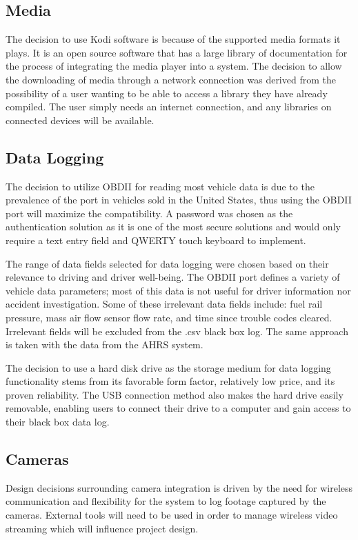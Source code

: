 \documentclass[onecolumn, draftclsnofoot,10pt, compsoc]{IEEEtran}
\begin{document}
\subsection{Media}
The decision to use Kodi software is because of the supported media formats it plays. It is an open source software that has a large library of documentation for the process of integrating the media player into a system. 
The decision to allow the downloading of media through a network connection was derived from the possibility of a user wanting to be able to access a library they have already compiled. The user simply needs an internet connection, and any libraries on connected devices will be available.

\subsection{Data Logging}
The decision to utilize OBDII for reading most vehicle data is due to the prevalence of the port in vehicles sold in the United States, thus using the OBDII port will maximize the compatibility. A password was chosen as the authentication solution as it is one of the most secure solutions and would only require a text entry field and QWERTY touch keyboard to implement.\par
The range of data fields selected for data logging were chosen based on their relevance to driving and driver well-being. The OBDII port defines a variety of vehicle data parameters; most of this data is not useful for driver information nor accident investigation. Some of these irrelevant data fields include: fuel rail pressure, mass air flow sensor flow rate, and time since trouble codes cleared. Irrelevant fields will be excluded from the .csv black box log. The same approach is taken with the data from the AHRS system.\par
The decision to use a hard disk drive as the storage medium for data logging functionality stems from its favorable form factor, relatively low price, and its proven reliability. The USB connection method also makes the hard drive easily removable, enabling users to connect their drive to a computer and gain access to their black box data log.\par

\subsection{Cameras}
Design decisions surrounding camera integration is driven by the need for wireless communication and flexibility for the system to log footage captured by the cameras. External tools will need to be used in order to manage wireless video streaming which will influence project design.
\end{document}
